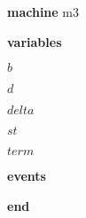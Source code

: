 \begin{block}
  \item   \textbf{machine} m3
  \item   \textbf{variables}
  \begin{block}
    \item   $b$
    \item   $d$
    \item   $delta$
    \item   $st$
    \item   $term$
  \end{block}
  \item   
  \item   \textbf{events}
  \begin{block}
    \item   
    \item   
    \item   
    \item   
  \end{block}
  \item   \textbf{end} \\
\end{block}
